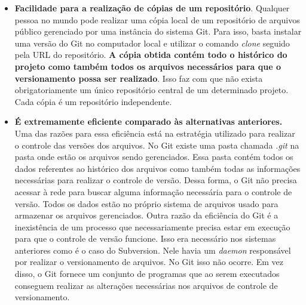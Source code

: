 \begin{itemize}
\item \textbf{Facilidade para a realização de cópias de um repositório}. Qualquer pessoa no mundo pode realizar uma cópia local de um repositório de arquivos público gerenciado por uma instância do sistema Git. Para isso, basta instalar uma versão do Git no computador local e utilizar o comando \textit{clone} seguido pela URL do repositório. \textbf{A cópia obtida contém todo o histórico do projeto como também todos os arquivos necessários para que o versionamento possa ser realizado}. Isso faz com que não exista obrigatoriamente um único repositório central de um determinado projeto. Cada cópia é um repositório independente. 

\item \textbf{É extremamente eficiente comparado às alternativas anteriores.} Uma das razões para essa eficiência está na estratégia utilizado para realizar o controle das versões dos arquivos. No Git existe uma pasta chamada \textit{.git} na pasta onde estão os arquivos sendo gerenciados. Essa pasta contém todos os dados referentes ao histórico dos arquivos como também todas as informações necessárias para realizar o controle de versão. Dessa forma, o Git não precisa acessar à rede para buscar alguma informação necessária para o controle de versão. Todos os dados estão no próprio sistema de arquivos usado para armazenar os arquivos gerenciados. Outra razão da eficiência do Git é a inexistência de um processo que necessariamente precisa estar em execução para que o controle de versão funcione. Isso era necessário nos sistemas anteriores como é o caso do Subversion. Nele havia um \textit{daemon} responsável por realizar o versionamento de arquivos. No Git isso não ocorre. Em vez disso, o Git fornece um conjunto de programas que ao serem executados conseguem realizar as alterações necessárias nos arquivos de controle de versionamento. 

\end{itemize}


